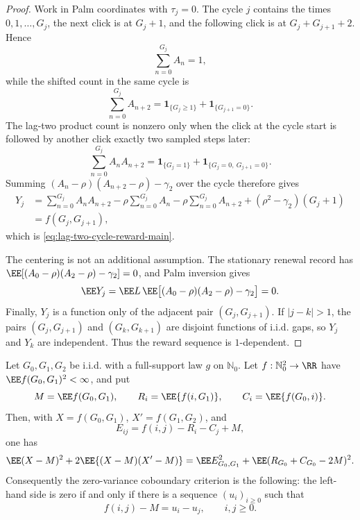 \begin{proof}
Work in Palm coordinates with \(\tau_j=0\).  The cycle \(j\) contains the
times \(0,1,\ldots,G_j\), the next click is at \(G_j+1\), and the following
click is at \(G_j+G_{j+1}+2\).  Hence
\[
\sum_{n=0}^{G_j}A_n=1,
\]
while the shifted count in the same cycle is
\[
\sum_{n=0}^{G_j}A_{n+2}
=\mathbf1_{\{G_j\ge1\}}+\mathbf1_{\{G_{j+1}=0\}}.
\]
The lag-two product count is nonzero only when the click at the cycle start
is followed by another click exactly two sampled steps later:
\[
\sum_{n=0}^{G_j}A_nA_{n+2}
=\mathbf1_{\{G_j=1\}}+\mathbf1_{\{G_j=0,\ G_{j+1}=0\}}.
\]
Summing
\((A_n-\rho)(A_{n+2}-\rho)-\gamma_2\) over the cycle therefore gives
\[
\begin{aligned}
Y_j
&=\sum_{n=0}^{G_j}A_nA_{n+2}
-\rho\sum_{n=0}^{G_j}A_n
-\rho\sum_{n=0}^{G_j}A_{n+2}
+(\rho^2-\gamma_2)(G_j+1)  \\
&=f(G_j,G_{j+1}),
\end{aligned}
\]
which is \eqref{eq:lag-two-cycle-reward-main}.

The centering is not an additional assumption.  The stationary renewal record
has \(\EE[(A_0-\rho)(A_2-\rho)-\gamma_2]=0\), and Palm inversion gives
\[
\EE Y_j
=\EE L\,
\EE\bigl[(A_0-\rho)(A_2-\rho)-\gamma_2\bigr]
=0.
\]
Finally, \(Y_j\) is a function only of the adjacent pair
\((G_j,G_{j+1})\).  If \(|j-k|>1\), the pairs
\((G_j,G_{j+1})\) and \((G_k,G_{k+1})\) are disjoint functions of i.i.d. gaps,
so \(Y_j\) and \(Y_k\) are independent.  Thus the reward sequence is
\(1\)-dependent.
\end{proof}

\begin{lemma}\label{lem:row-column-coboundary-criterion-main}
Let \(G_0,G_1,G_2\) be i.i.d. with a full-support law \(g\) on
\(\mathbb N_0\).  Let \(f:\mathbb N_0^2\to\RR\) have
\(\EE f(G_0,G_1)^2<\infty\), and put
\[
M=\EE f(G_0,G_1),\qquad
R_i=\EE\{f(i,G_1)\},\qquad
C_i=\EE\{f(G_0,i)\}.
\]
Then, with \(X=f(G_0,G_1)\), \(X'=f(G_1,G_2)\), and
\[
E_{ij}=f(i,j)-R_i-C_j+M,
\]
one has
\begin{equation}\label{eq:row-column-variance-decomposition-main}
\EE(X-M)^2+2\EE\{(X-M)(X'-M)\}
=
\EE E_{G_0,G_1}^2+\EE(R_{G_0}+C_{G_0}-2M)^2 .
\end{equation}
Consequently the zero-variance coboundary criterion is the following: the
left-hand side is zero if and only if there is a sequence
\((u_i)_{i\ge0}\) such that
\begin{equation}\label{eq:row-column-zero-coboundary-main}
f(i,j)-M=u_i-u_j,\qquad i,j\ge0 .
\end{equation}
\end{lemma}

